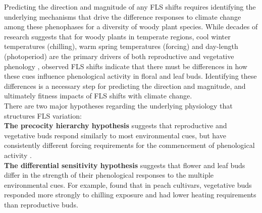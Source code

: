 \documentclass[11pt]{article}
\begin{document}
Predicting the direction and magnitude of any FLS shifts requires identifying the underlying mechanisms that drive the difference responses to climate change among these phenophases for a diversity of woody plant species. %
 While decades of research suggests that for woody plants in temperate regions, cool winter temperatures (chilling), warm spring temperatures (forcing) and day-length (photoperiod) are the primary drivers of both reproductive and vegetative phenology \citep{Forrest2018,Flynn2018}, observed FLS shifts indicate that there must be differences in how these cues influence phenological activity in floral and leaf buds. Identifying these differences is a necessary step for predicting the direction and magnitude, and ultimately fitness impacts of FLS shifts with climate change.\\

\noindent There are two major hypotheses regarding the underlying physiology that structures FLS variation:\\

\noindent \textbf{The precocity hierarchy hypothesis} suggests that reproductive and vegetative buds respond similarly to most environmental cues, but have consistently different forcing requirements for the commencement of phenological activity \citep{Guo_2014}.\\

\noindent \textbf{The differential sensitivity hypothesis} suggests that flower and leaf buds differ in the strength of their phenological responses to the multiple environmental cues. For example, \citet{Garigalio2016} found that in peach cultivars, vegetative buds responded more strongly to chilling exposure and had lower heating requirements than reproductive buds. \\
\end{document}

